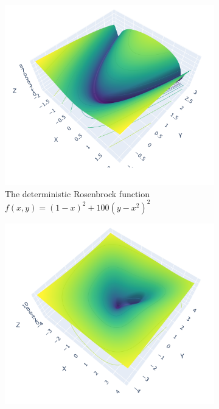 \begin{figure}[h]
    \begin{subfigure}[b]{0.48\linewidth}
        \centering
        \includegraphics[width=\linewidth]{figures/2background/rosenbrock.png}
        \caption{The deterministic Rosenbrock function \\ 
        $f(x,y) = (1-x)^2 + 100(y-x^2)^2$}
        \label{fig:rosenbrock}
    \end{subfigure}
    \hfill
    \begin{subfigure}[b]{0.48\linewidth}
        \centering
        \includegraphics[width=\linewidth]{figures/2background/wood_func.png}

\end{subfigure}
\end{figure}
